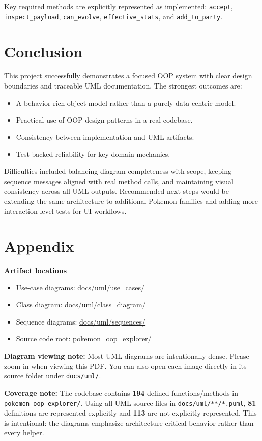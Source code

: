 \documentclass[12pt]{article}
\begin{document}
Key required methods are explicitly represented as implemented:
\texttt{accept}, \texttt{inspect\_payload}, \texttt{can\_evolve},
\texttt{effective\_stats}, and \texttt{add\_to\_party}.

\section*{Conclusion}
This project successfully demonstrates a focused OOP system with clear design
boundaries and traceable UML documentation. The strongest outcomes are:
\begin{itemize}
    \item A behavior-rich object model rather than a purely data-centric model.
    \item Practical use of OOP design patterns in a real codebase.
    \item Consistency between implementation and UML artifacts.
    \item Test-backed reliability for key domain mechanics.
\end{itemize}

Difficulties included balancing diagram completeness with scope, keeping
sequence messages aligned with real method calls, and maintaining visual
consistency across all UML outputs. Recommended next steps would be extending
the same architecture to additional Pokemon families and adding more
interaction-level tests for UI workflows.

\section*{Appendix}
\textbf{Artifact locations}
\begin{itemize}
    \item Use-case diagrams: \url{docs/uml/use_cases/}
    \item Class diagram: \url{docs/uml/class_diagram/}
    \item Sequence diagrams: \url{docs/uml/sequences/}
    \item Source code root: \url{pokemon_oop_explorer/}
\end{itemize}

\textbf{Diagram viewing note:} Most UML diagrams are intentionally dense.
Please zoom in when viewing this PDF. You can also open each image directly in
its source folder under \texttt{docs/uml/}.

\textbf{Coverage note:} The codebase contains \textbf{194} defined
functions/methods in \texttt{pokemon\_oop\_explorer/}. Using all UML source
files in \texttt{docs/uml/**/*.puml}, \textbf{81} definitions are represented
explicitly and \textbf{113} are not explicitly represented. This is intentional:
the diagrams emphasize architecture-critical behavior rather than every helper.
\end{document}
